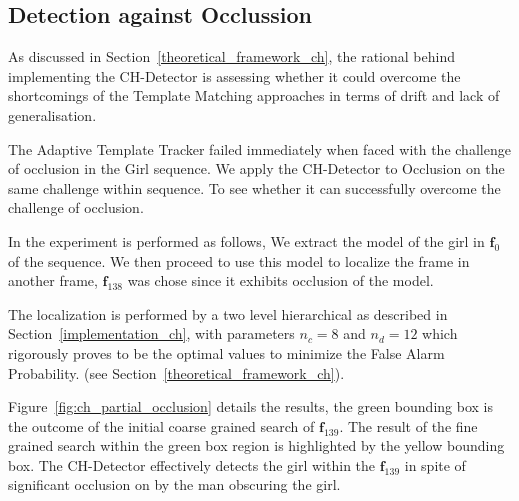 \subsection{Detection against Occlussion}
As discussed in Section~\ref{theoretical_framework_ch}, the rational behind
implementing the CH-Detector is assessing whether it could overcome the
shortcomings of the Template Matching approaches in terms of drift and lack of
generalisation.

The Adaptive Template Tracker failed immediately when faced with the challenge
of occlusion in the Girl sequence. We apply the CH-Detector to Occlusion on the
same challenge within sequence. To see whether it can successfully overcome the
challenge of occlusion.

In the experiment is performed as follows, We extract the model of the girl in
$\mathbf{f}_0$ of the sequence. We then proceed to use this model to localize
the frame in another frame, $\mathbf{f}_{138}$ was chose since it exhibits
occlusion of the model. 

The localization is performed by a two level hierarchical as described in
Section~\ref{implementation_ch}, with parameters $n_c=8$ and $n_d=12$ which
\cite{Change} rigorously proves to be the optimal values to minimize the False
Alarm Probability. (see Section~\ref{theoretical_framework_ch}).

Figure~\ref{fig:ch_partial_occlusion} details the results, the green bounding
box is the outcome of the initial coarse grained search of $\mathbf{f}_{139}$.
The result of the fine grained search within the green box region is highlighted
by the yellow bounding box. 
The CH-Detector effectively detects the girl within the $\mathbf{f}_{139}$ in
spite of significant occlusion on by the man obscuring the girl. 

